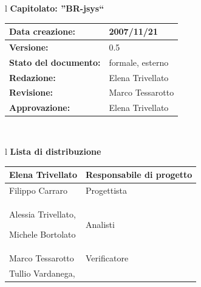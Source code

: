 \documentclass[11pt,titlepage,a4paper]{report}
\begin{document}
\begin{center}
\thispagestyle{plain}
\begin{table}[htbp]
\large{
\begin{tabular}{l}
\Large{\textbf{\textsf{Capitolato: ''BR-jsys``}}} \\
\begin{tabular}{||p{6cm}||p{6cm}||}
\hline
\textbf{Data creazione:} & 2007/11/21 \\
\hline
\textbf{Versione:} & 0.5 \\
\hline
\textbf{Stato del documento:} & formale, esterno \\
\hline
\textbf{Redazione:} &  Elena Trivellato \\
\hline
\textbf{Revisione:} &  Marco Tessarotto  \\
\hline
\textbf{Approvazione:}  & Elena Trivellato\\
\hline
\end{tabular} \\
\end{tabular}
}
\end{table}

\begin{table}[hbtp]
\large{
\begin{tabular}{l}
\Large{\textbf{\textsf{Lista di distribuzione}}} \\
\begin{tabular}{||p{6cm}||p{6cm}||}
\hline
{Elena Trivellato}& Responsabile di progetto \\ 
\hline 
{Filippo Carraro}& Progettista \\ 
\hline
{Alessia Trivellato, 

Michele Bortolato}& Analisti \\
\hline
{Marco Tessarotto}& Verificatore \\
\hline
{Tullio Vardanega,

}
\end{tabular}
\end{tabular}}
\end{table}
\end{center}
\end{document}

